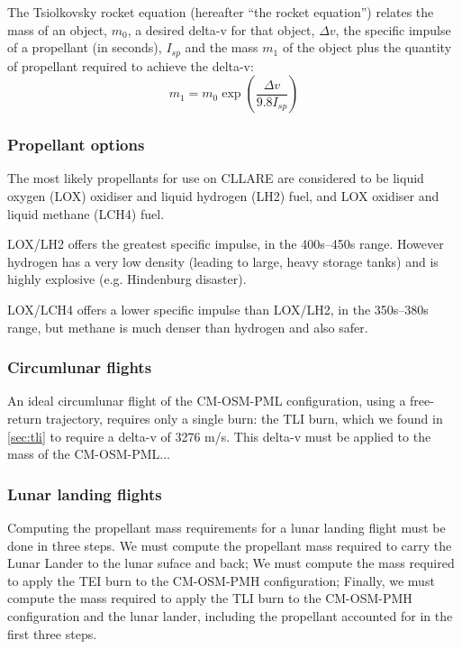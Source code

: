 \documentclass{report}
\begin{document}
The Tsiolkovsky rocket equation (hereafter ``the rocket equation'') relates the mass of an object, $m_0$, a desired delta-v for that object, $\Delta v$, the specific impulse of a propellant (in seconds), $I_{sp}$ and the mass $m_1$ of the object plus the quantity of propellant required to achieve the delta-v:
\begin{equation}
m_1 = m_0\exp \left( \frac{\Delta v}{9.8 I_{sp}} \right)
\end{equation}

\subsubsection{Propellant options}

The most likely propellants for use on CLLARE are considered to be liquid oxygen (LOX) oxidiser and liquid hydrogen (LH2) fuel, and LOX oxidiser and liquid methane (LCH4) fuel.

LOX/LH2 offers the greatest specific impulse, in the 400s--450s range.  However hydrogen has a very low density (leading to large, heavy storage tanks) and is highly explosive (e.g. Hindenburg disaster).

LOX/LCH4 offers a lower specific impulse than LOX/LH2, in the 350s--380s range, but methane is much denser than hydrogen and also safer.

\subsubsection{Circumlunar flights}

An ideal circumlunar flight of the CM-OSM-PML configuration, using a free-return trajectory, requires only a single burn: the TLI burn, which we found in \ref{sec:tli} to require a delta-v of 3276 m/s.  This delta-v must be applied to the mass of the CM-OSM-PML...

\subsubsection{Lunar landing flights}

Computing the propellant mass requirements for a lunar landing flight must be done in three steps.  We must compute the propellant mass required to carry the Lunar Lander to the lunar suface and back; We must compute the mass required to apply the TEI burn to the CM-OSM-PMH configuration; Finally, we must compute the mass required to apply the TLI burn to the CM-OSM-PMH configuration and the lunar lander, including the propellant accounted for in the first three steps.
\end{document}
